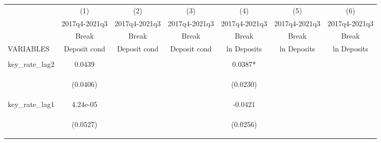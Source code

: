 



\begin{tabular}{lcccccc} \hline
 & (1) & (2) & (3) & (4) & (5) & (6) \\
 & 2017q4-2021q3 & 2017q4-2021q3 & 2017q4-2021q3 & 2017q4-2021q3 & 2017q4-2021q3 & 2017q4-2021q3 \\
 & Break & Break & Break & Break & Break & Break \\
VARIABLES & Deposit cond & Deposit cond & Deposit cond & ln Deposits & ln Deposits & ln Deposits \\ \hline
\vspace{4pt} & \begin{footnotesize}\end{footnotesize} & \begin{footnotesize}\end{footnotesize} & \begin{footnotesize}\end{footnotesize} & \begin{footnotesize}\end{footnotesize} & \begin{footnotesize}\end{footnotesize} & \begin{footnotesize}\end{footnotesize} \\
key\_rate\_lag2 & 0.0439 &  &  & 0.0387* &  &  \\
\vspace{4pt} & \begin{footnotesize}(0.0406)\end{footnotesize} & \begin{footnotesize}\end{footnotesize} & \begin{footnotesize}\end{footnotesize} & \begin{footnotesize}(0.0230)\end{footnotesize} & \begin{footnotesize}\end{footnotesize} & \begin{footnotesize}\end{footnotesize} \\
key\_rate\_lag1 & 4.24e-05 &  &  & -0.0421 &  &  \\
\vspace{4pt} & \begin{footnotesize}(0.0527)\end{footnotesize} & \begin{footnotesize}\end{footnotesize} & \begin{footnotesize}\end{footnotesize} & \begin{footnotesize}(0.0256)\end{footnotesize} & \begin{footnotesize}\end{footnotesize} & \begin{footnotesize}\end{footnotesize} \\

\end{tabular}
